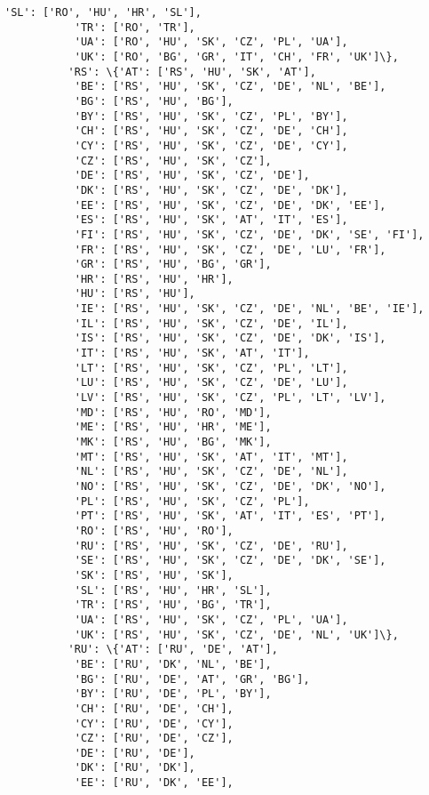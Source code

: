\documentclass[11pt]{article}
\begin{document}
\begin{Verbatim}[commandchars=\\\{\}]
           'SL': ['RO', 'HU', 'HR', 'SL'],
           'TR': ['RO', 'TR'],
           'UA': ['RO', 'HU', 'SK', 'CZ', 'PL', 'UA'],
           'UK': ['RO', 'BG', 'GR', 'IT', 'CH', 'FR', 'UK']\},
          'RS': \{'AT': ['RS', 'HU', 'SK', 'AT'],
           'BE': ['RS', 'HU', 'SK', 'CZ', 'DE', 'NL', 'BE'],
           'BG': ['RS', 'HU', 'BG'],
           'BY': ['RS', 'HU', 'SK', 'CZ', 'PL', 'BY'],
           'CH': ['RS', 'HU', 'SK', 'CZ', 'DE', 'CH'],
           'CY': ['RS', 'HU', 'SK', 'CZ', 'DE', 'CY'],
           'CZ': ['RS', 'HU', 'SK', 'CZ'],
           'DE': ['RS', 'HU', 'SK', 'CZ', 'DE'],
           'DK': ['RS', 'HU', 'SK', 'CZ', 'DE', 'DK'],
           'EE': ['RS', 'HU', 'SK', 'CZ', 'DE', 'DK', 'EE'],
           'ES': ['RS', 'HU', 'SK', 'AT', 'IT', 'ES'],
           'FI': ['RS', 'HU', 'SK', 'CZ', 'DE', 'DK', 'SE', 'FI'],
           'FR': ['RS', 'HU', 'SK', 'CZ', 'DE', 'LU', 'FR'],
           'GR': ['RS', 'HU', 'BG', 'GR'],
           'HR': ['RS', 'HU', 'HR'],
           'HU': ['RS', 'HU'],
           'IE': ['RS', 'HU', 'SK', 'CZ', 'DE', 'NL', 'BE', 'IE'],
           'IL': ['RS', 'HU', 'SK', 'CZ', 'DE', 'IL'],
           'IS': ['RS', 'HU', 'SK', 'CZ', 'DE', 'DK', 'IS'],
           'IT': ['RS', 'HU', 'SK', 'AT', 'IT'],
           'LT': ['RS', 'HU', 'SK', 'CZ', 'PL', 'LT'],
           'LU': ['RS', 'HU', 'SK', 'CZ', 'DE', 'LU'],
           'LV': ['RS', 'HU', 'SK', 'CZ', 'PL', 'LT', 'LV'],
           'MD': ['RS', 'HU', 'RO', 'MD'],
           'ME': ['RS', 'HU', 'HR', 'ME'],
           'MK': ['RS', 'HU', 'BG', 'MK'],
           'MT': ['RS', 'HU', 'SK', 'AT', 'IT', 'MT'],
           'NL': ['RS', 'HU', 'SK', 'CZ', 'DE', 'NL'],
           'NO': ['RS', 'HU', 'SK', 'CZ', 'DE', 'DK', 'NO'],
           'PL': ['RS', 'HU', 'SK', 'CZ', 'PL'],
           'PT': ['RS', 'HU', 'SK', 'AT', 'IT', 'ES', 'PT'],
           'RO': ['RS', 'HU', 'RO'],
           'RU': ['RS', 'HU', 'SK', 'CZ', 'DE', 'RU'],
           'SE': ['RS', 'HU', 'SK', 'CZ', 'DE', 'DK', 'SE'],
           'SK': ['RS', 'HU', 'SK'],
           'SL': ['RS', 'HU', 'HR', 'SL'],
           'TR': ['RS', 'HU', 'BG', 'TR'],
           'UA': ['RS', 'HU', 'SK', 'CZ', 'PL', 'UA'],
           'UK': ['RS', 'HU', 'SK', 'CZ', 'DE', 'NL', 'UK']\},
          'RU': \{'AT': ['RU', 'DE', 'AT'],
           'BE': ['RU', 'DK', 'NL', 'BE'],
           'BG': ['RU', 'DE', 'AT', 'GR', 'BG'],
           'BY': ['RU', 'DE', 'PL', 'BY'],
           'CH': ['RU', 'DE', 'CH'],
           'CY': ['RU', 'DE', 'CY'],
           'CZ': ['RU', 'DE', 'CZ'],
           'DE': ['RU', 'DE'],
           'DK': ['RU', 'DK'],
           'EE': ['RU', 'DK', 'EE'],

\end{Verbatim}
\end{document}
